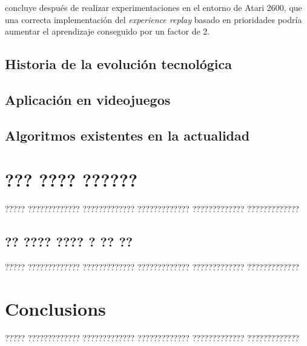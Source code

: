 \documentclass[11pt,spanish,listoffigures,listoftables]{tfgetsinf}
\begin{document}
\cite{exp_replay_prior} concluye después de realizar experimentaciones en el entorno de Atari 2600, que una correcta implementación del \textit{experience replay} basado en prioridades podría aumentar el aprendizaje conseguido por un factor de 2.



\section{Historia de la evolución tecnológica}

\section{Aplicación en videojuegos}



\section{Algoritmos existentes en la actualidad}



\chapter{??? ???? ??????}

????? ????????????? ????????????? ????????????? ????????????? ????????????? 

\section{?? ???? ???? ? ?? ??}

????? ????????????? ????????????? ????????????? ????????????? ?????????????


\chapter{Conclusions}

????? ????????????? ????????????? ????????????? ????????????? ????????????? 

\end{document}
